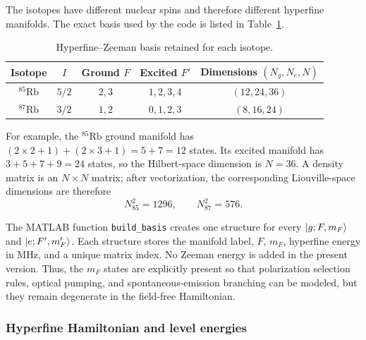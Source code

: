The isotopes have different nuclear spins and therefore different hyperfine
manifolds.  The exact basis used by the code is listed in
Table~\ref{tab:dm_basis}.

\begin{table}[t]
\centering
\small
\renewcommand{\arraystretch}{1.15}
\caption{Hyperfine--Zeeman basis retained for each isotope.}
\label{tab:dm_basis}
\begin{tabular}{ccccc}
\toprule
Isotope & \(I\) & Ground \(F\) & Excited \(F'\) & Dimensions \((N_g,N_e,N)\) \\
\midrule
\(^{85}\mathrm{Rb}\) & \(5/2\) & \(2,3\) & \(1,2,3,4\) & \((12,24,36)\) \\
\(^{87}\mathrm{Rb}\) & \(3/2\) & \(1,2\) & \(0,1,2,3\) & \((8,16,24)\) \\
\bottomrule
\end{tabular}
\end{table}

For example, the \(^{85}\mathrm{Rb}\) ground manifold has
\((2\times2+1)+(2\times3+1)=5+7=12\) states.  Its excited manifold has
\(3+5+7+9=24\) states, so the Hilbert-space dimension is \(N=36\).
A density matrix is an \(N\times N\) matrix; after vectorization, the
corresponding Liouville-space dimensions are therefore
\begin{equation}
N_{85}^{2}=1296,
\qquad
N_{87}^{2}=576.
\end{equation}

The MATLAB function \texttt{build\_basis} creates one structure for every
\(\left|g;F,m_F\right\rangle\) and \(\left|e;F',m_F'\right\rangle\).  Each structure stores the
manifold label, \(F\), \(m_F\), hyperfine energy in MHz, and a unique matrix
index.  No Zeeman energy is added in the present version.  Thus, the
\(m_F\) states are explicitly present so that polarization selection rules,
optical pumping, and spontaneous-emission branching can be modeled, but they
remain degenerate in the field-free Hamiltonian.

\subsubsection{Hyperfine Hamiltonian and level energies}

